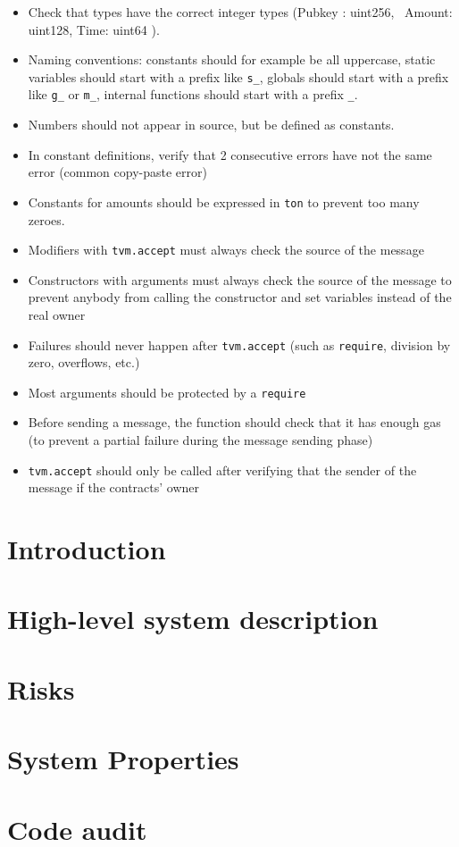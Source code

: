 \documentclass{report}
\begin{document}
\begin{itemize}
\item Check that types have the correct integer types (Pubkey : uint256, \
   Amount: uint128, Time: uint64 ).
\item Naming conventions: constants should for example be all uppercase, static variables should start with a prefix like \verb+s_+, globals should start with a prefix like \verb+g_+ or \verb+m_+, internal functions should start with a prefix \verb+_+.
\item Numbers should not appear in source, but be defined as constants.
\item In constant definitions, verify that 2 consecutive errors have not the same error (common copy-paste error)
\item Constants for amounts should be expressed in \verb+ton+ to prevent too many zeroes.
\item Modifiers with {\tt tvm.accept} must always check the source of the message
\item Constructors with arguments must always check the source of the message to prevent anybody from calling the constructor and set variables instead of the real owner
\item Failures should never happen after {\tt tvm.accept} (such as {\tt require}, division by zero, overflows, etc.)
\item Most arguments should be protected by a {\tt require}
\item Before sending a message, the function should check that it has enough gas (to prevent a partial failure during the message sending phase)
\item {\tt tvm.accept} should only be called after verifying that the sender of the message if the contracts' owner
\end{itemize}
\fi

\chapter{Introduction}


\chapter{High-level system description}


\chapter{Risks}


\chapter{System Properties}



\chapter{Code audit}

\end{document}
